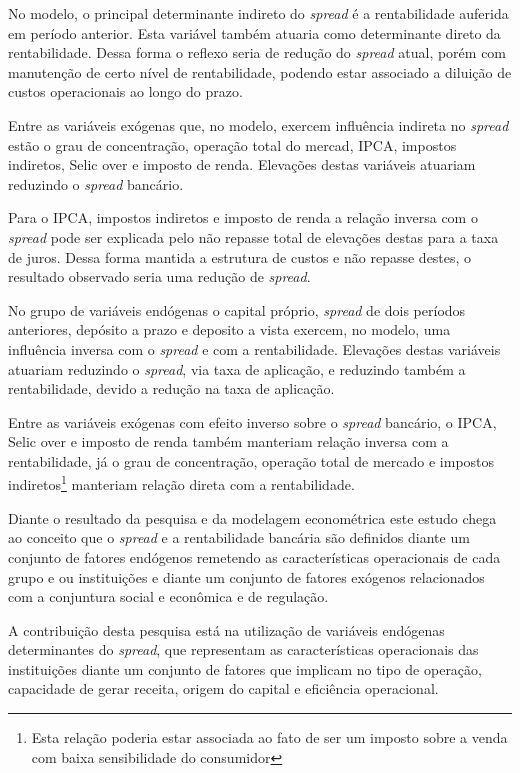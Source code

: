 \documentclass[
  12pt,
  12pt,
  openright,
  oneside,
  a4paper,
  chapter=TITLE,
  section=TITLE,
  subsection=TITLE,
  subsubsection=TITLE,
  portugues,
  sumario=tradicional]{abntex2}
\begin{document}
No modelo, o principal determinante indireto do \emph{spread} é a rentabilidade auferida em período anterior. Esta variável também atuaria como determinante direto da rentabilidade. Dessa forma o reflexo seria de redução do \emph{spread} atual, porém com manutenção de certo nível de rentabilidade, podendo estar associado a diluição de custos operacionais ao longo do prazo.

Entre as variáveis exógenas que, no modelo, exercem influência indireta no \emph{spread} estão o grau de concentração, operação total do mercad, IPCA, impostos indiretos, Selic over e imposto de renda. Elevações destas variáveis atuariam reduzindo o \emph{spread} bancário.

Para o IPCA, impostos indiretos e imposto de renda a relação inversa com o \emph{spread} pode ser explicada pelo não repasse total de elevações destas para a taxa de juros. Dessa forma mantida a estrutura de custos e não repasse destes, o resultado observado seria uma redução de \emph{spread}.

No grupo de variáveis endógenas o capital próprio, \emph{spread} de dois períodos anteriores, depósito a prazo e deposito a vista exercem, no modelo, uma influência inversa com o \emph{spread} e com a rentabilidade. Elevações destas variáveis atuariam reduzindo o \emph{spread}, via taxa de aplicação, e reduzindo também a rentabilidade, devido a redução na taxa de aplicação.

Entre as variáveis exógenas com efeito inverso sobre o \emph{spread} bancário, o IPCA, Selic over e imposto de renda também manteriam relação inversa com a rentabilidade, já o grau de concentração, operação total de mercado e impostos indiretos\footnote{Esta relação poderia estar associada ao fato de ser um imposto sobre a venda com baixa sensibilidade do consumidor} manteriam relação direta com a rentabilidade.

Diante o resultado da pesquisa e da modelagem econométrica este estudo chega ao conceito que o \emph{spread} e a rentabilidade bancária são definidos diante um conjunto de fatores endógenos remetendo as características operacionais de cada grupo e ou instituições e diante um conjunto de fatores exógenos relacionados com a conjuntura social e econômica e de regulação.

A contribuição desta pesquisa está na utilização de variáveis endógenas determinantes do \emph{spread}, que representam as características operacionais das instituições diante um conjunto de fatores que implicam no tipo de operação, capacidade de gerar receita, origem do capital e eficiência operacional.
\end{document}
